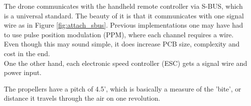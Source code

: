 The drone communicates with the handheld remote controller via S-BUS, which is a universal standard. The beauty of it is that it communicates with one signal wire as in Figure \ref{fig:attach_sbus}. Previous implementations one may have had to use pulse position modulation (PPM), where each channel requires a wire. Even though this may sound simple, it does increase PCB size, complexity and cost in the end.\\

\noindent
One the other hand, each electronic speed controller (ESC) gets a signal wire and power input.

\noindent
The propellers have a pitch of 4.5', which is basically a measure of the 'bite', or distance it travels through the air on one revolution.












